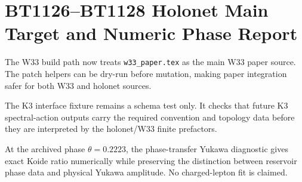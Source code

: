 \section{BT1126--BT1128 Holonet Main Target and Numeric Phase Report}
\label{sec:bt1126-bt1128-holonet-mainpaper-fixture-numeric}

The W33 build path now treats \texttt{w33\_paper.tex} as the main W33 paper source.  The patch helpers can be dry-run before mutation, making paper integration safer for both W33 and holonet sources.

The K3 interface fixture remains a schema test only.  It checks that future K3 spectral-action outputs carry the required convention and topology data before they are interpreted by the holonet/W33 finite prefactors.

At the archived phase $\theta=0.2223$, the phase-transfer Yukawa diagnostic gives exact Koide ratio numerically while preserving the distinction between reservoir phase data and physical Yukawa amplitude.  No charged-lepton fit is claimed.

